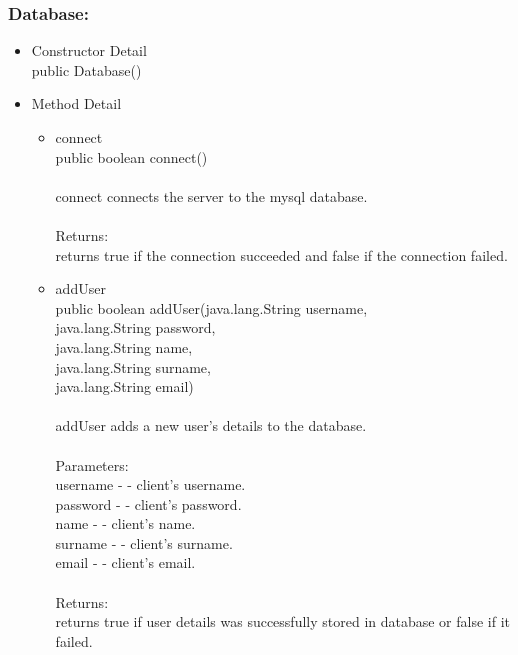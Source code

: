 \documentclass[letterpaper]{article}
\begin{document}
								\subsubsection*{Database:}
								\vspace{0.1in}	
									\begin{itemize}
										\item	Constructor Detail \\
												public Database()
										\item	Method Detail
												\begin{itemize}
													\item	connect \\
															public boolean connect() \\ \\
															connect connects the server to the mysql database. \\ \\
															Returns: \\
															returns true if the connection succeeded and false if the connection failed.
													\item	addUser \\
															public boolean addUser(java.lang.String username, \\
						              java.lang.String password, \\
						              java.lang.String name, \\
						              java.lang.String surname, \\
						              java.lang.String email) \\ \\
															addUser adds a new user's details to the database. \\ \\
															Parameters: \\
															username - - client's username. \\
															password - - client's password. \\
															name - - client's name. \\ 
															surname - - client's surname. \\
															email - - client's email. \\ \\
															Returns: \\
															returns true if user details was successfully stored in database or false if it failed.

\end{itemize}
\end{itemize}
\end{document}
